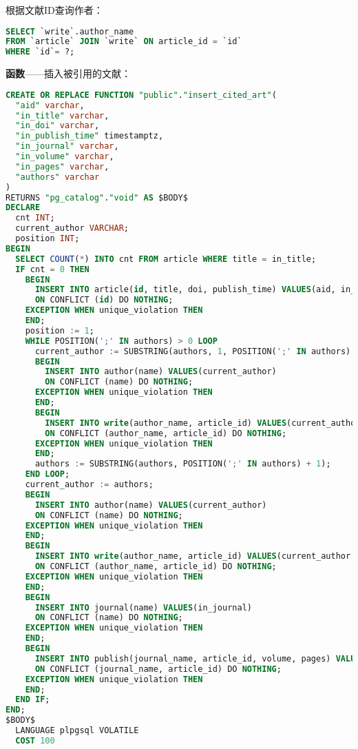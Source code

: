 \documentclass[UTF8,openany]{ctexbook}
\begin{document}
根据文献ID查询作者：

\begin{lstlisting}[language=sql]
SELECT `write`.author_name
FROM `article` JOIN `write` ON article_id = `id`
WHERE `id`= ?;
\end{lstlisting}

\textbf{函数}——插入被引用的文献：

\begin{lstlisting}[language=sql]
CREATE OR REPLACE FUNCTION "public"."insert_cited_art"(
  "aid" varchar, 
  "in_title" varchar, 
  "in_doi" varchar, 
  "in_publish_time" timestamptz, 
  "in_journal" varchar, 
  "in_volume" varchar, 
  "in_pages" varchar, 
  "authors" varchar
)
RETURNS "pg_catalog"."void" AS $BODY$
DECLARE
  cnt INT;
  current_author VARCHAR;
  position INT;
BEGIN
  SELECT COUNT(*) INTO cnt FROM article WHERE title = in_title;
  IF cnt = 0 THEN  
    BEGIN
      INSERT INTO article(id, title, doi, publish_time) VALUES(aid, in_title, in_doi, in_publish_time)
      ON CONFLICT (id) DO NOTHING;
    EXCEPTION WHEN unique_violation THEN   
    END;
    position := 1;
    WHILE POSITION(';' IN authors) > 0 LOOP
      current_author := SUBSTRING(authors, 1, POSITION(';' IN authors) - 1);
      BEGIN
        INSERT INTO author(name) VALUES(current_author)
        ON CONFLICT (name) DO NOTHING;
      EXCEPTION WHEN unique_violation THEN 
      END;
      BEGIN
        INSERT INTO write(author_name, article_id) VALUES(current_author, aid)
        ON CONFLICT (author_name, article_id) DO NOTHING;
      EXCEPTION WHEN unique_violation THEN 
      END;
      authors := SUBSTRING(authors, POSITION(';' IN authors) + 1);
    END LOOP;
    current_author := authors;
    BEGIN
      INSERT INTO author(name) VALUES(current_author)
      ON CONFLICT (name) DO NOTHING;
    EXCEPTION WHEN unique_violation THEN  
    END;
    BEGIN
      INSERT INTO write(author_name, article_id) VALUES(current_author, aid)
      ON CONFLICT (author_name, article_id) DO NOTHING;
    EXCEPTION WHEN unique_violation THEN  
    END;
    BEGIN
      INSERT INTO journal(name) VALUES(in_journal)
      ON CONFLICT (name) DO NOTHING;
    EXCEPTION WHEN unique_violation THEN    
    END;
    BEGIN
      INSERT INTO publish(journal_name, article_id, volume, pages) VALUES(in_journal, aid, in_volume, in_pages)
      ON CONFLICT (journal_name, article_id) DO NOTHING;
    EXCEPTION WHEN unique_violation THEN  
    END;
  END IF;
END;
$BODY$
  LANGUAGE plpgsql VOLATILE
  COST 100
\end{lstlisting}
\end{document}
